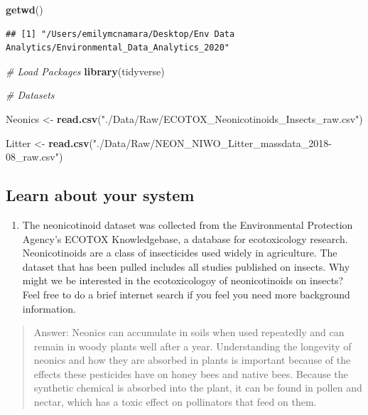 \documentclass[]{article}
\newenvironment{Shaded}{\begin{snugshade}}{\end{snugshade}}
\newcommand{\KeywordTok}[1]{\textcolor[rgb]{0.13,0.29,0.53}{\textbf{#1}}}
\newcommand{\StringTok}[1]{\textcolor[rgb]{0.31,0.60,0.02}{#1}}
\newcommand{\CommentTok}[1]{\textcolor[rgb]{0.56,0.35,0.01}{\textit{#1}}}
\newcommand{\NormalTok}[1]{#1}
\providecommand{\tightlist}{%
  \setlength{\itemsep}{0pt}\setlength{\parskip}{0pt}}
\begin{document}
\begin{Shaded}
\begin{Highlighting}[]
\KeywordTok{getwd}\NormalTok{()}
\end{Highlighting}
\end{Shaded}

\begin{verbatim}
## [1] "/Users/emilymcnamara/Desktop/Env Data Analytics/Environmental_Data_Analytics_2020"
\end{verbatim}

\begin{Shaded}
\begin{Highlighting}[]
\CommentTok{# Load Packages}
\KeywordTok{library}\NormalTok{(tidyverse)}

\CommentTok{# Datasets}

\NormalTok{Neonics <-}\StringTok{ }\KeywordTok{read.csv}\NormalTok{(}\StringTok{"./Data/Raw/ECOTOX_Neonicotinoids_Insects_raw.csv"}\NormalTok{)}


\NormalTok{Litter <-}\StringTok{ }\KeywordTok{read.csv}\NormalTok{(}\StringTok{"./Data/Raw/NEON_NIWO_Litter_massdata_2018-08_raw.csv"}\NormalTok{)}
\end{Highlighting}
\end{Shaded}

\subsection{Learn about your system}\label{learn-about-your-system}

\begin{enumerate}
\def\labelenumi{\arabic{enumi}.}
\setcounter{enumi}{1}
\tightlist
\item
  The neonicotinoid dataset was collected from the Environmental
  Protection Agency's ECOTOX Knowledgebase, a database for ecotoxicology
  research. Neonicotinoids are a class of insecticides used widely in
  agriculture. The dataset that has been pulled includes all studies
  published on insects. Why might we be interested in the ecotoxicologoy
  of neonicotinoids on insects? Feel free to do a brief internet search
  if you feel you need more background information.
\end{enumerate}

\begin{quote}
Answer: Neonics can accumulate in soils when used repeatedly and can
remain in woody plants well after a year. Understanding the longevity of
neonics and how they are absorbed in plants is important because of the
effects these pesticides have on honey bees and native bees. Because the
synthetic chemical is absorbed into the plant, it can be found in pollen
and nectar, which has a toxic effect on pollinators that feed on them.
\end{quote}
\end{document}
